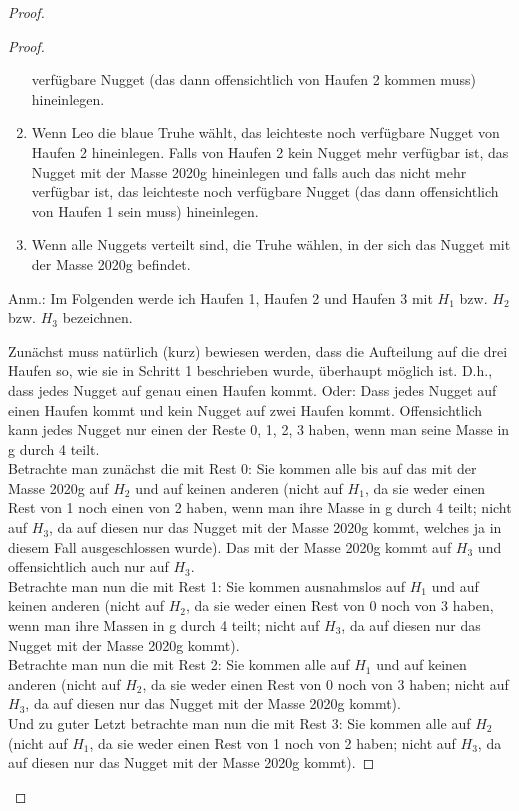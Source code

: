 \begin{proof}
\begin{proof}
\begin{enumerate}
            verfügbare Nugget (das dann offensichtlich von Haufen 2 kommen muss) hineinlegen.
            \item Wenn Leo die blaue Truhe wählt, das leichteste noch verfügbare Nugget von Haufen  2 hineinlegen. Falls 
            von Haufen 2 kein Nugget mehr verfügbar ist, das Nugget mit der Masse 2020g hineinlegen und falls auch das 
            nicht mehr verfügbar ist, das leichteste noch verfügbare Nugget (das dann offensichtlich von Haufen 1 
            sein muss) hineinlegen.
            \item Wenn alle Nuggets verteilt sind, die Truhe wählen, in der sich das Nugget mit der Masse 2020g 
            befindet.

        \end{enumerate}

        Anm.: Im Folgenden werde ich Haufen 1, Haufen 2 und Haufen 3 mit $H_1$ bzw. $H_2$ bzw. $H_3$ bezeichnen.

        Zunächst muss natürlich (kurz) bewiesen werden, dass die Aufteilung auf die drei Haufen so, wie sie in 
        Schritt 1 beschrieben wurde, überhaupt möglich ist. D.h., dass jedes Nugget auf genau einen Haufen kommt. 
        Oder: Dass jedes Nugget auf einen Haufen kommt und kein Nugget auf zwei Haufen kommt. Offensichtlich kann 
        jedes Nugget nur einen der Reste 0, 1, 2, 3 haben, wenn man seine Masse in g durch 4 teilt. \\
        Betrachte man zunächst die mit Rest 0: Sie kommen alle bis auf das mit der Masse 2020g auf $H_2$ und auf 
        keinen anderen (nicht auf $H_1$, da sie weder einen Rest von 1 noch einen von 2 haben, wenn man ihre 
        Masse in g durch 4 teilt; nicht auf $H_3$, da auf diesen nur das Nugget mit der Masse 2020g kommt, 
        welches ja in diesem Fall ausgeschlossen wurde). Das mit der Masse 2020g kommt auf $H_3$ und 
        offensichtlich auch nur auf $H_3$. \\
        Betrachte man nun die mit Rest 1: Sie kommen ausnahmslos auf $H_1$ und auf keinen anderen (nicht auf $H_2$, da sie 
        weder einen Rest von 0 noch von 3 haben, wenn man ihre Massen in g durch 4 teilt; nicht auf $H_3$, da auf 
        diesen nur das Nugget mit der Masse 2020g kommt). \\
        Betrachte man nun die mit Rest 2: Sie kommen alle auf $H_1$ und auf keinen anderen (nicht auf $H_2$, da sie weder 
        einen Rest von 0 noch von 3 haben; nicht auf $H_3$, da auf diesen nur das Nugget mit der Masse 2020g kommt). \\
        Und zu guter Letzt betrachte man nun die mit Rest 3: Sie kommen alle auf $H_2$ (nicht auf $H_1$, da sie weder 
        einen Rest von 1 noch von 2 haben; nicht auf $H_3$, da auf diesen nur das Nugget mit der Masse 2020g kommt).


\end{proof}
\end{proof}
